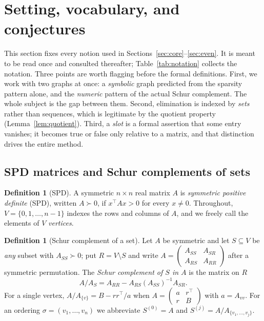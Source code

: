\documentclass[11pt]{article}
\theoremstyle{plain}
\theoremstyle{definition}
\newtheorem{definition}[theorem]{Definition}
\begin{document}
\section{Setting, vocabulary, and conjectures}\label{sec:setting}
\begin{humanblock}
This section fixes every notion used in Sections~\ref{sec:core}--\ref{sec:even}. It is meant to be
read once and consulted thereafter; Table~\ref{tab:notation} collects the notation. Three points are
worth flagging before the formal definitions. First, we work with two graphs at once: a
\emph{symbolic} graph predicted from the sparsity pattern alone, and the \emph{numeric} pattern of
the actual Schur complement. The whole subject is the gap between them. Second, elimination is
indexed by \emph{sets} rather than sequences, which is legitimate by the quotient property
(Lemma~\ref{lem:quotient}). Third, a \emph{slot} is a formal assertion that some entry vanishes; it
becomes true or false only relative to a matrix, and that distinction drives the entire method.

\subsection{SPD matrices and Schur complements of sets}

\begin{definition}[SPD]\label{def:spd}
A symmetric $n\times n$ real matrix $A$ is \emph{symmetric positive definite} (SPD), written
$A\succ0$, if $x^\top Ax>0$ for every $x\neq0$. Throughout, $V=\{0,1,\dots,n-1\}$ indexes the rows
and columns of $A$, and we freely call the elements of $V$ \emph{vertices}.
\end{definition}

\begin{definition}[Schur complement of a set]\label{def:spd-schur}
Let $A$ be symmetric and let $S\subseteq V$ be \emph{any} subset with $A_{SS}\succ0$; put
$R=V\setminus S$ and write $A=\begin{pmatrix}A_{SS}&A_{SR}\\A_{RS}&A_{RR}\end{pmatrix}$ after a
symmetric permutation. The \emph{Schur complement of $S$ in $A$} is the matrix on $R$
\[
A/A_S = A_{RR}-A_{RS}(A_{SS})^{-1}A_{SR}.
\]
For a single vertex, $A/A_{\{v\}}=B-rr^\top/a$ when $A=\begin{pmatrix}a&r^\top\\r&B\end{pmatrix}$ with
$a=A_{vv}$. For an ordering $\sigma=(v_1,\dots,v_n)$ we abbreviate $S^{(0)}=A$ and
$S^{(j)}=A/A_{\{v_1,\dots,v_j\}}$.
\end{definition}


\end{humanblock}
\end{document}
